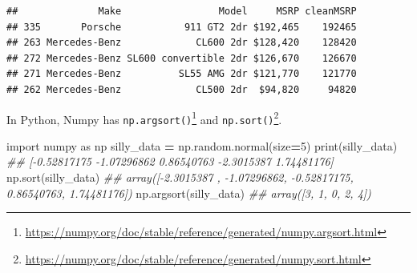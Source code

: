 \documentclass[
  12pt,
  krantz2]{krantz}
\makeatletter
\newenvironment{Shaded}{\begin{snugshade}}{\end{snugshade}}
\newcommand{\AttributeTok}[1]{\textcolor[rgb]{0.61,0.61,0.61}{#1}}
\newcommand{\BuiltInTok}[1]{#1}
\newcommand{\CommentTok}[1]{\textcolor[rgb]{0.37,0.37,0.37}{\textit{#1}}}
\newcommand{\ConstantTok}[1]{\textcolor[rgb]{0,0,0}{#1}}
\newcommand{\DecValTok}[1]{\textcolor[rgb]{0.06,0.06,0.06}{#1}}
\newcommand{\FunctionTok}[1]{\textcolor[rgb]{0,0,0}{#1}}
\newcommand{\ImportTok}[1]{#1}
\newcommand{\NormalTok}[1]{#1}
\newcommand{\OperatorTok}[1]{\textcolor[rgb]{0.43,0.43,0.43}{\textbf{#1}}}
\newcommand{\OtherTok}[1]{\textcolor[rgb]{0.37,0.37,0.37}{#1}}
\newcommand{\SpecialCharTok}[1]{\textcolor[rgb]{0,0,0}{#1}}
\newcommand{\StringTok}[1]{\textcolor[rgb]{0.5,0.5,0.5}{#1}}
\renewcommand{\href}[2]{#2\footnote{\url{#1}}}
\newenvironment{kframe}{%
\medskip{}
\setlength{\fboxsep}{.8em}
 \def\at@end@of@kframe{}%
 \ifinner\ifhmode%
  \def\at@end@of@kframe{\end{minipage}}%
  \begin{minipage}{\columnwidth}%
 \fi\fi%
 \def\FrameCommand##1{\hskip\@totalleftmargin \hskip-\fboxsep
 \colorbox{shadecolor}{##1}\hskip-\fboxsep
     \hskip-\linewidth \hskip-\@totalleftmargin \hskip\columnwidth}%
 \MakeFramed {\advance\hsize-\width
   \@totalleftmargin\z@ \linewidth\hsize
   \@setminipage}}%
 {\par\unskip\endMakeFramed%
 \at@end@of@kframe}
\renewenvironment{Shaded}{\begin{kframe}}{\end{kframe}}
\makeatother
\begin{document}
\begin{Shaded}
\end{Shaded}

\begin{verbatim}
##              Make                 Model     MSRP cleanMSRP
## 335       Porsche           911 GT2 2dr $192,465    192465
## 263 Mercedes-Benz             CL600 2dr $128,420    128420
## 272 Mercedes-Benz SL600 convertible 2dr $126,670    126670
## 271 Mercedes-Benz          SL55 AMG 2dr $121,770    121770
## 262 Mercedes-Benz             CL500 2dr  $94,820     94820
\end{verbatim}

In Python, Numpy has \href{https://numpy.org/doc/stable/reference/generated/numpy.argsort.html}{\texttt{np.argsort()}} and \href{https://numpy.org/doc/stable/reference/generated/numpy.sort.html}{\texttt{np.sort()}}.

\begin{Shaded}
\begin{Highlighting}[]
\ImportTok{import}\NormalTok{ numpy }\ImportTok{as}\NormalTok{ np}
\NormalTok{silly\_data }\OperatorTok{=}\NormalTok{ np.random.normal(size}\OperatorTok{=}\DecValTok{5}\NormalTok{)}
\BuiltInTok{print}\NormalTok{(silly\_data)}
\CommentTok{\#\# [{-}0.52817175 {-}1.07296862  0.86540763 {-}2.3015387   1.74481176]}
\NormalTok{np.sort(silly\_data)}
\CommentTok{\#\# array([{-}2.3015387 , {-}1.07296862, {-}0.52817175,  0.86540763,  1.74481176])}
\NormalTok{np.argsort(silly\_data)}
\CommentTok{\#\# array([3, 1, 0, 2, 4])}
\end{Highlighting}
\end{Shaded}
\end{document}
